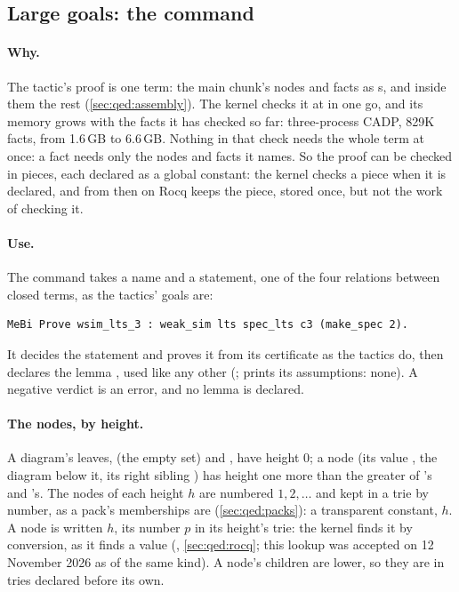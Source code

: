\subsection{Large goals: the command \texorpdfstring{}{MeBi Prove}}\label{sec:qed:prove}

\paragraph{Why.} The tactic's proof is one term: the main chunk's nodes
and facts as s, and inside them the rest
(\cref{sec:qed:assembly}). The kernel checks it at  in one go,
and its memory grows with the facts it has checked so far: three-process
CADP, 829K facts, from 1.6\,GB to 6.6\,GB. Nothing in that check needs
the whole term at once: a fact needs only the nodes and facts it names.
So the proof can be checked in pieces, each declared as a global
constant: the kernel checks a piece when it is declared, and from then on
Rocq keeps the piece, stored once, but not the work of checking it.

\paragraph{Use.} The command takes a name and a statement, one of the
four relations between closed terms, as the tactics' goals are:
\begin{verbatim}
MeBi Prove wsim_lts_3 : weak_sim lts spec_lts c3 (make_spec 2).
\end{verbatim}
It decides the statement and proves it from its certificate as the
tactics do, then declares the lemma , used like any
other (; 
prints its assumptions: none). A negative verdict is an error, and no
lemma is declared.

\paragraph{The nodes, by height.} A diagram's leaves,  (the
empty set) and , have height 0; a node  (its
value , the diagram  below it, its right sibling
) has height one more than the greater of 's and
's. The nodes of each height $h$ are numbered $1, 2, \dots$ and
kept in a trie by number, as a pack's memberships are
(\cref{sec:qed:packs}): a transparent constant, $h$. A node
is written $h$, its number $p$ in its
height's trie: the kernel finds it by conversion, as it finds a value
(, \cref{sec:qed:rocq}; this lookup was accepted on 12 November
2026 as of the same kind). A node's children are lower, so they are in
tries declared before its own.

